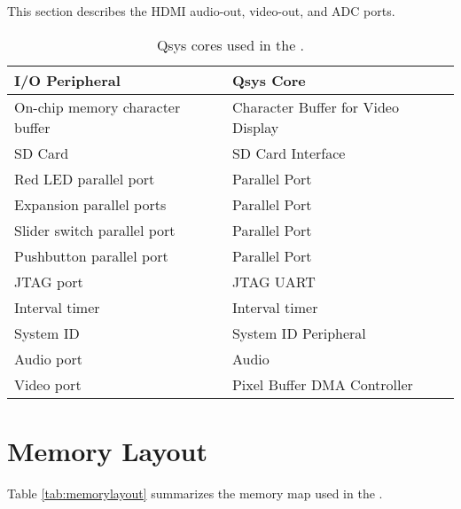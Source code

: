 This section describes the HDMI audio-out, video-out, and ADC ports.





\newpage


\begin{table}[h]
    \begin{center}
    \begin{tabular}{l|l}
            \textbf{I/O Peripheral}
            & \textbf{Qsys Core}
        \\\hline
            On-chip memory character buffer
				& Character Buffer for Video Display
        \\
            SD Card
        &   SD Card Interface
        \\
            Red LED parallel port
				& Parallel Port
        \\
            Expansion parallel ports
				& Parallel Port
        \\
            Slider switch parallel port
				& Parallel Port
        \\
            Pushbutton parallel port
				& Parallel Port
        \\
            JTAG port
				& JTAG UART
        \\
            Interval timer
				& Interval timer 
        \\
            System ID
				& System ID Peripheral
        \\
            Audio port
				& Audio
        \\
            Video port
				& Pixel Buffer DMA Controller
        \\
    \end{tabular}
    \caption{Qsys cores used in the \systemName.}
    \label{tab:sopcnames}
    \end{center}
\end{table}



\section{Memory Layout}

\noindent
Table \ref{tab:memorylayout} summarizes the memory map used in the \systemName.
~\\

